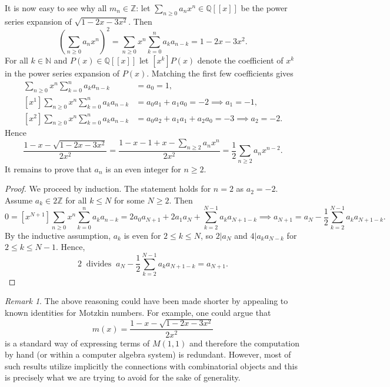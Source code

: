 \documentclass[11pt]{article}
\theoremstyle{definition}
\theoremstyle{plain}
\theoremstyle{remark}
\newtheorem{rem}[defi]{Remark}
\begin{document}
It is now easy to see why all $m_n \in \mathbb{Z}$: let $\sum\limits_{n \geq 0}a_nx^n \in \mathbb{Q}[[x]]$ be the power series expansion of $\sqrt{1-2x-3x^2}$. Then
\[\left(\sum\limits_{n \geq 0}a_nx^n\right)^2 = \sum\limits_{n \geq 0} x^n \sum\limits_{k=0}^{n} a_{k}a_{n-k} = 1-2x-3x^2.\]
For all $k\in\mathbb{N}$ and $ P(x)\in \mathbb{Q}[[x]]$ let $[x^k]P(x)$ denote the coefficient of $x^k$ in the power series expansion of $P(x)$. Matching the first few coefficients gives
\begin{align*}
[x^0] \sum\limits_{n \geq 0} x^n \sum\limits_{k=0}^{n} a_{k}a_{n-k} & = a_0 = 1, \\
[x^1] \sum\limits_{n \geq 0} x^n \sum\limits_{k=0}^{n} a_{k}a_{n-k} & = a_0a_1 + a_1a_0 = -2 \implies a_1 = -1, \\
[x^2] \sum\limits_{n \geq 0} x^n \sum\limits_{k=0}^{n} a_{k}a_{n-k}  & = a_0a_2 + a_1a_1 + a_2a_0 = -3 \implies a_2 = -2.
\end{align*}
Hence \[\frac{1-x-\sqrt{1-2x-3x^2}}{2x^2} = \frac{1-x-1+x-\sum_{n \geq 2}a_nx^n}{2x^2} = \frac{1}{2}\sum\limits_{n \geq 2}a_nx^{n-2}.\] It remains to prove that $a_n$ is an even integer for $n \geq 2$.

\begin{proof} 
We proceed by induction. The statement holds for $n = 2$ as $a_2 = -2$. Assume $a_k \in 2\mathbb{Z}$ for all $k \leq N$ for some $N \geq 2$. Then 
\[0 = [x^{N+1}] \sum\limits_{n \geq 0} x^n \sum\limits_{k=0}^{n} a_{k}a_{n-k} = 2a_0a_{N+1} + 2a_1a_N + \sum\limits_{k=2}^{N-1} a_{k}a_{N+1-k} \implies a_{N+1} = a_N - \frac{1}{2} \sum\limits_{k=2}^{N-1} a_{k}a_{N+1-k}.\]
By the inductive assumption, $a_k$ is even for $2\leq k \leq N$, so $2|a_N$ and $4|a_ka_{N-k}$ for $2\leq k \leq N-1$. Hence, 
\[2\  \text{ divides }\  a_N - \frac{1}{2} \sum\limits_{k=2}^{N-1} a_{k}a_{N+1-k} = a_{N+1}.\]
\end{proof}

\begin{rem}
The above reasoning could have been made shorter by appealing to known identities for Motzkin numbers. For example, one could argue that 
\[m(x) = \frac{1-x-\sqrt{1-2x-3x^2}}{2x^2}\]
is a standard way of expressing terms of $M(1,1)$ and therefore the computation by hand (or within a computer algebra system) is redundant. However, most of such results utilize implicitly the connections with combinatorial objects and this is precisely what we are trying to avoid for the sake of generality.
\end{rem}
\end{document}
